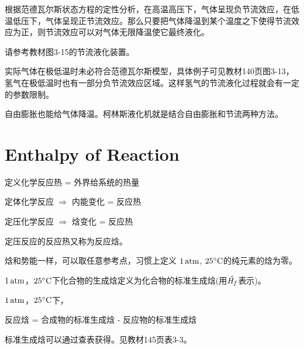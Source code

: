 \documentclass[CJK]{beamer}
\begin{document}
\begin{frame}
\bch
{\small
根据范德瓦尔斯状态方程的定性分析，在高温高压下，气体呈现负节流效应，在低温低压下，气体呈现正节流效应。那么只要把气体降温到某个温度之下使得节流效应为正，则节流效应可以对气体无限降温使它最终液化。

\skiplines

请参考教材图3-15的节流液化装置。

\skiplines

\bitem
\item{实际气体在极低温时未必符合范德瓦尔斯模型，具体例子可见教材140页图3-13，氢气在极低温时也有一部分负节流效应区域。这样氢气的节流液化过程就会有一定的参数限制。}
\item{自由膨胀也能给气体降温。柯林斯液化机就是结合自由膨胀和节流两种方法。}
\eitem

}
\ech
\end{frame}

\section{Enthalpy of Reaction}


\begin{frame}
\bch
定义化学反应热 = 外界给系统的热量

\skipline

\bitem
\item{定体化学反应 $\Rightarrow$ 内能变化 = 反应热}
\item{定压化学反应 $\Rightarrow$ 焓变化 = 反应热}
\eitem

\skipline

定压反应的反应热又称为{\blue 反应焓}。
\ech
\end{frame}

\begin{frame}
\bch
焓和势能一样，可以取任意参考点，{\blue 习惯上定义 $1\,\mathrm{atm}$, $25^\circ \mathrm{C}$的纯元素的焓为零}。

\skipline

{\blue $1\,\mathrm{atm}$，$25^\circ \mathrm{C}$下化合物的生成焓定义为化合物的标准生成焓(用$\stdHf$表示)}。

\skipline

{\blue $1\,\mathrm{atm}$，$25^\circ \mathrm{C}$下，

 反应焓 = 合成物的标准生成焓 - 反应物的标准生成焓}

\skiplines

标准生成焓可以通过查表获得。见教材145页表3-3。

\ech
\end{frame}
\end{document}
